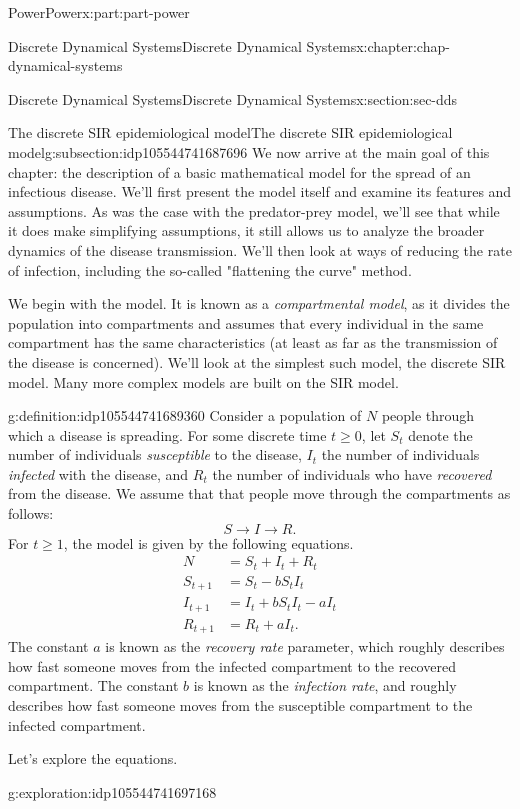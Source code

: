 \documentclass[oneside,10pt,]{book}
\numberwithin{equation}{section}
\renewcommand{\ge}{\geqslant}
\newcommand{\amp}{&}
\begin{document}
\begin{partptx}{Power}{}{Power}{}{}{x:part:part-power}
\begin{chapterptx}{Discrete Dynamical Systems}{}{Discrete Dynamical Systems}{}{}{x:chapter:chap-dynamical-systems}
\begin{sectionptx}{Discrete Dynamical Systems}{}{Discrete Dynamical Systems}{}{}{x:section:sec-dds}
\begin{subsectionptx}{The discrete SIR epidemiological model}{}{The discrete SIR epidemiological model}{}{}{g:subsection:idp105544741687696}
We now arrive at the main goal of this chapter: the description of a basic mathematical model for the spread of an infectious disease. We'll first present the model itself and examine its features and assumptions. As was the case with the predator-prey model, we'll see that while it does make simplifying assumptions, it still allows us to analyze the broader dynamics of the disease transmission. We'll then look at ways of reducing the rate of infection, including the so-called "flattening the curve" method.%
\par
We begin with the model. It is known as a \emph{compartmental model}, as it divides the population into compartments and assumes that every individual in the same compartment has the same characteristics (at least as far as the transmission of the disease is concerned). We'll look at the simplest such model, the discrete SIR model. Many more complex models are built on the SIR model.%
\begin{definition}{}{g:definition:idp105544741689360}%
Consider a population of \(N\) people through which a disease is spreading. For some discrete time \(t \ge 0\), let \(S_t\) denote the number of individuals \emph{susceptible} to the disease, \(I_t\) the number of individuals \emph{infected} with the disease, and \(R_t\) the number of individuals who have \emph{recovered} from the disease. We assume that that people move through the compartments as follows:%
%
\begin{equation}
S \to I \to R.\label{x:men:eq-compartments}
\end{equation}
For \(t\ge 1\), the model is given by the following equations.%
%
\begin{align*}
N \amp = S_t + I_t + R_t\\
S_{t+1} \amp = S_t -b S_t I_t\\
I_{t+1} \amp = I_t + b S_t I_t - a I_t\\
R_{t+1} \amp = R_t + a I_t.
\end{align*}
The constant \(a\) is known as the \emph{recovery rate} parameter, which roughly describes how fast someone moves from the infected compartment to the recovered compartment. The constant \(b\) is known as the \emph{infection rate}, and roughly describes how fast someone moves from the susceptible compartment to the infected compartment.%
\end{definition}
Let's explore the equations.%
\begin{exploration}{}{g:exploration:idp105544741697168}%
%
\begin{enumerate}

\end{enumerate}
\end{exploration}
\end{subsectionptx}
\end{sectionptx}
\end{chapterptx}
\end{partptx}
\end{document}

